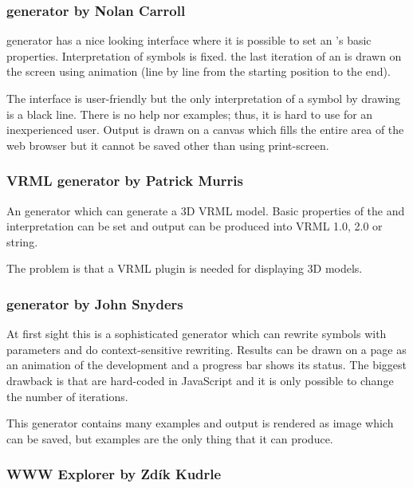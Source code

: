 \subsubsection{\lsystem generator by Nolan Carroll}	

\noindent
\lsystem generator has a nice looking interface where it is possible to set an \lsystem's basic properties.
Interpretation of symbols is fixed.
the last iteration of an \lsystem is drawn on the screen using animation (line by line from the starting position to the end).

The interface is user-friendly but the only interpretation of a symbol by drawing is a black line.
There is no help nor examples; thus, it is hard to use for an inexperienced user.
Output is drawn on a canvas which fills the entire area of the web browser but it cannot be saved other than using print-screen.


\subsubsection{VRML \lsystem generator by Patrick Murris}
  
\noindent
An \lsystem generator which can generate a 3D VRML model.
Basic properties of the \lsystem and interpretation can be set and output can be produced into VRML 1.0, 2.0 or string.

The problem is that a VRML plugin is needed for displaying 3D models.



\subsubsection{\lsystem generator by John Snyders}

\noindent
At first sight this is a sophisticated \lsystem generator which can rewrite symbols with parameters and do context-sensitive rewriting.
Results can be drawn on a page as an animation of the development and a progress bar shows its status.
The biggest drawback is that \lsystems are hard-coded in JavaScript and it is only possible to change the number of iterations.

This \lsystem generator contains many examples and output is rendered as image which can be saved, but examples are the only thing that it can produce.


\subsubsection{WWW \lsystem Explorer by Zdík Kudrle}


